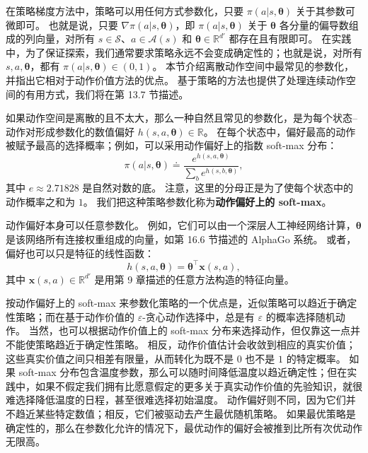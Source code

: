 \documentclass[UTF8,12pt,a4paper,fontset=fandol]{ctexart}
\begin{document}
在策略梯度方法中，策略可以用任何方式参数化，只要 $\pi(a|s,\boldsymbol{\theta})$ 关于其参数可微即可。
也就是说，只要 $\nabla\pi(a|s,\boldsymbol{\theta})$，即 $\pi(a|s,\boldsymbol{\theta})$ 关于 $\boldsymbol{\theta}$ 各分量的偏导数组成的列向量，对所有 $s\in\mathcal{S}$、$a\in\mathcal{A}(s)$ 和 $\boldsymbol{\theta}\in\mathbb{R}^{d'}$ 都存在且有限即可。
在实践中，为了保证探索，我们通常要求策略永远不会变成确定性的；也就是说，对所有 $s,a,\boldsymbol{\theta}$，都有 $\pi(a|s,\boldsymbol{\theta})\in(0,1)$。
本节介绍离散动作空间中最常见的参数化，并指出它相对于动作价值方法的优点。
基于策略的方法也提供了处理连续动作空间的有用方式，我们将在第 13.7 节描述。

如果动作空间是离散的且不太大，那么一种自然且常见的参数化，是为每个状态--动作对形成参数化的数值偏好 $h(s,a,\boldsymbol{\theta})\in\mathbb{R}$。
在每个状态中，偏好最高的动作被赋予最高的选择概率；例如，可以采用动作偏好上的指数 soft-max 分布：
\begin{equation}
\pi(a|s,\boldsymbol{\theta})\doteq
\frac{e^{h(s,a,\boldsymbol{\theta})}}
{\sum_b e^{h(s,b,\boldsymbol{\theta})}},
\tag{13.2}
\end{equation}
其中 $e\approx2.71828$ 是自然对数的底。
注意，这里的分母正是为了使每个状态中的动作概率之和为 $1$。
我们把这种策略参数化称为\textbf{动作偏好上的 soft-max}。

动作偏好本身可以任意参数化。
例如，它们可以由一个深层人工神经网络计算，$\boldsymbol{\theta}$ 是该网络所有连接权重组成的向量，如第 16.6 节描述的 AlphaGo 系统。
或者，偏好也可以只是特征的线性函数：
\begin{equation}
h(s,a,\boldsymbol{\theta})=\boldsymbol{\theta}^\top \mathbf{x}(s,a),
\tag{13.3}
\end{equation}
其中 $\mathbf{x}(s,a)\in\mathbb{R}^{d'}$ 是用第 9 章描述的任意方法构造的特征向量。

按动作偏好上的 soft-max 来参数化策略的一个优点是，近似策略可以趋近于确定性策略；而在基于动作价值的 $\varepsilon$-贪心动作选择中，总是有 $\varepsilon$ 的概率选择随机动作。
当然，也可以根据动作价值上的 soft-max 分布来选择动作，但仅靠这一点并不能使策略趋近于确定性策略。
相反，动作价值估计会收敛到相应的真实价值；这些真实价值之间只相差有限量，从而转化为既不是 $0$ 也不是 $1$ 的特定概率。
如果 soft-max 分布包含温度参数，那么可以随时间降低温度以趋近确定性；但在实践中，如果不假定我们拥有比愿意假定的更多关于真实动作价值的先验知识，就很难选择降低温度的日程，甚至很难选择初始温度。
动作偏好则不同，因为它们并不趋近某些特定数值；相反，它们被驱动去产生最优随机策略。
如果最优策略是确定性的，那么在参数化允许的情况下，最优动作的偏好会被推到比所有次优动作无限高。
\end{document}
